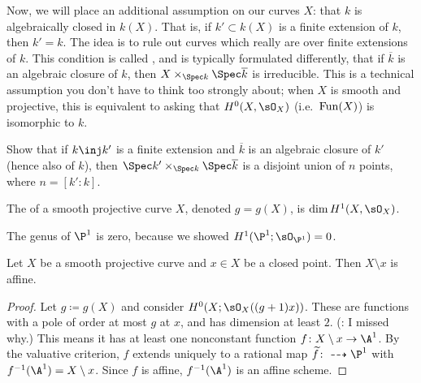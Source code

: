 Now, we will place an additional assumption on our curves $X$: that $k$ is algebraically closed in $k(X)$. That is, if $k'\subset k(X)$ is a finite extension of $k$, then $k' = k$. The idea is to rule out curves which really are over finite extensions of $k$. This condition is called , and is typically formulated differently, that if $\overline k$ is an algebraic closure of $k$, then $X\times_{\Spec k}\Spec\overline k$ is irreducible. This is a technical assumption you don't have to think too strongly about; when $X$ is smooth and projective, this is equivalent to asking that $H^0(X,\sO_X)$ (i.e.\ $\mathrm{Fun}(X)$) is isomorphic to $k$.
\begin{ex}
Show that if $k\inj k'$ is a finite extension and $\overline k$ is an algebraic closure of $k'$ (hence also of $k$), then $\Spec k'\times_{\Spec k}\Spec\overline k$ is a disjoint union of $n$ points, where $n = [k':k]$.
\end{ex}
\begin{defn}
The  of a smooth projective curve $X$, denoted $g = g(X)$, is $\dim H^1(X,\sO_X)$.
\end{defn}
\begin{exm}
The genus of $\P^1$ is zero, because we showed $H^1(\P^1;\sO_{\P^1}) = 0$.
\end{exm}
\begin{cor}
Let $X$ be a smooth projective curve and $x\in X$ be a closed point. Then $X\setminus x$ is affine.
\end{cor}
\begin{proof}
Let $g\coloneqq g(X)$ and consider $H^0(X;\sO_X((g+1)x))$. These are functions with a pole of order at most $g$ at $x$, and has dimension at least $2$. (\TODO: I missed why.) This means it has at least one nonconstant function $f\colon X\setminus x\to\A^1$. By the valuative criterion, $f$ extends uniquely to a rational map $\widetilde f\colon \dashrightarrow \P^1$ with $f^{-1}(\A^1) = X\setminus x$. Since $f$ is affine, $f^{-1}(\A^1)$ is an affine scheme.
\end{proof}
